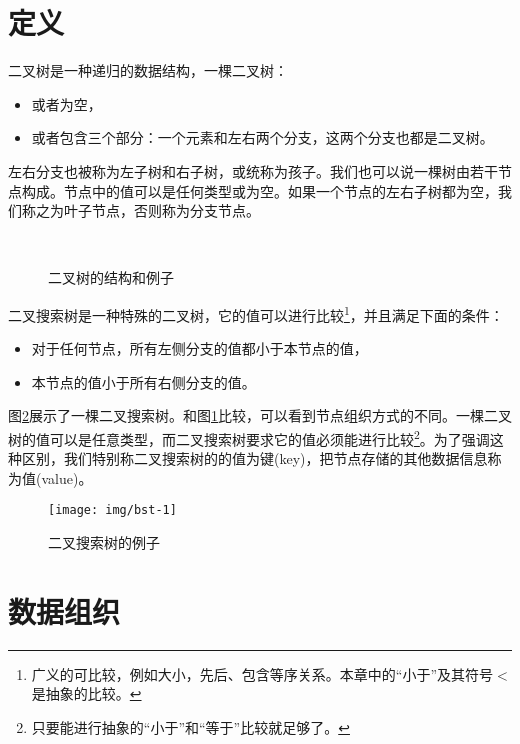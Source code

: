 \documentclass[b5paper]{ctexart}
\begin{document}
\section{定义}
\label{introduction} 

二叉树是一种递归的数据结构，一棵二叉树：

\begin{itemize}
\item 或者为空，
\item 或者包含三个部分：一个元素和左右两个分支，这两个分支也都是二叉树。
\end{itemize}

左右分支也被称为左子树和右子树，或统称为孩子。我们也可以说一棵树由若干节点构成。节点中的值可以是任何类型或为空。如果一个节点的左右子树都为空，我们称之为叶子节点，否则称为分支节点。

\begin{figure}[htbp]
  \centering
   \\
  \caption{二叉树的结构和例子}
  \label{fig:binary-tree-example}
\end{figure}

二叉搜索树是一种特殊的二叉树，它的值可以进行比较\footnote{广义的可比较，例如大小，先后、包含等序关系。本章中的“小于”及其符号$<$是抽象的比较。}，并且满足下面的条件：
\begin{itemize}
\item 对于任何节点，所有左侧分支的值都小于本节点的值，
\item 本节点的值小于所有右侧分支的值。
\end{itemize}

图\ref{fig:bst-example}展示了一棵二叉搜索树。和图\ref{fig:binary-tree-example}比较，可以看到节点组织方式的不同。一棵二叉树的值可以是任意类型，而二叉搜索树要求它的值必须能进行比较\footnote{只要能进行抽象的“小于”和“等于”比较就足够了。}。为了强调这种区别，我们特别称二叉搜索树的的值为键(key)，把节点存储的其他数据信息称为值(value)。

\begin{figure}[htbp]
  \centering
  \texttt{[image: img/bst-1]}
  \caption{二叉搜索树的例子} \label{fig:bst-example}
\end{figure}


\section{数据组织}
\end{document}
